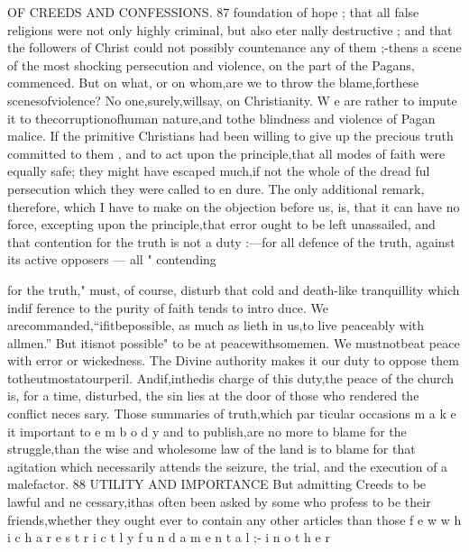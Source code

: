 \documentclass[
]{book}
\begin{document}
OF CREEDS AND CONFESSIONS. 87
foundation of hope ; that all false religions were not only highly criminal, but also eter nally destructive ; and that the followers of
Christ could not possibly countenance any of
them ;-thens a scene of the most shocking
persecution and violence, on the part of the
Pagans, commenced. But on what, or on
whom,are we to throw the blame,forthese
scenesofviolence? No one,surely,willsay,
on Christianity. W e are rather to impute it
to thecorruptionofhuman nature,and tothe
blindness and violence of Pagan malice. If
the primitive Christians had been willing to
give up the precious truth committed to them ,
and to act upon the principle,that all modes
of faith were equally safe; they might have
escaped much,if not the whole of the dread
ful persecution which they were called to en dure.
The only additional remark, therefore, which I have to make on the objection before us, is, that it can have no force, excepting upon the principle,that error ought to be left unassailed, and that contention for the truth
is not a duty :---for all defence of the truth, against its active opposers --- all " contending

for the truth," must, of course, disturb that cold and death-like tranquillity which indif
ference to the purity of faith tends to intro
duce. We arecommanded,``ifitbepossible,
as much as lieth in us,to live peaceably with
allmen.'' But itisnot possible" to be at peacewithsomemen. We mustnotbeat
peace with error or wickedness. The Divine authority makes it our duty to oppose them
totheutmostatourperil. Andif,inthedis charge of this duty,the peace of the church is, for a time, disturbed, the sin lies at the door of those who rendered the conflict neces sary. Those summaries of truth,which par ticular occasions m a k e it important to e m b o d y and to publish,are no more to blame for the struggle,than the wise and wholesome law of
the land is to blame for that agitation which
necessarily attends the seizure, the trial, and the execution of a malefactor.
88 UTILITY AND IMPORTANCE
But admitting Creeds to be lawful and ne cessary,ithas often been asked by some who profess to be their friends,whether they ought ever to contain any other articles than those f e w w h i c h a r e s t r i c t l y f u n d a m e n t a l ;- i n o t h e r
\end{document}
